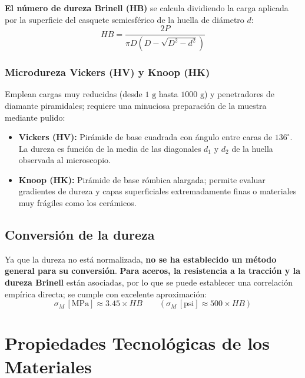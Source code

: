 \textbf{El número de dureza Brinell (HB)} se calcula dividiendo la carga aplicada por la superficie del casquete semiesférico de la huella de diámetro $d$:
\begin{equation}
    HB = \frac{2P}{\pi D \left(D - \sqrt{D^2 - d^2}\right)}
    \label{eq:dureza_brinell}
\end{equation}

\subsubsection{Microdureza Vickers (HV) y Knoop (HK)}
Emplean cargas muy reducidas (desde $1\text{ g}$ hasta $1000\text{ g}$) y penetradores de diamante piramidales; requiere una minuciosa preparación de la muestra mediante pulido:
\begin{itemize}
    \item \textbf{Vickers (HV):} Pirámide de base cuadrada con ángulo entre caras de $136^\circ$. La dureza es función de la media de las diagonales $d_1$ y $d_2$ de la huella observada al microscopio.
    \item \textbf{Knoop (HK):} Pirámide de base rómbica alargada; permite evaluar gradientes de dureza y capas superficiales extremadamente finas o materiales muy frágiles como los cerámicos.
\end{itemize}
\subsection{Conversión de la dureza}
Ya que la dureza no está normalizada, \textbf{no se ha establecido un método general para su conversión}. \textbf{Para aceros, la resistencia a la tracción y la dureza Brinell} están asociadas, por lo que se puede establecer una correlación empírica directa; se cumple con excelente aproximación:
\begin{equation}
    \sigma_M \, [\text{MPa}] \approx 3.45 \times HB \qquad \left(\sigma_M \, [\text{psi}] \approx 500 \times HB\right)
    \label{eq:relacion_dureza_resistencia}
\end{equation}

\section{Propiedades Tecnológicas de los Materiales}

